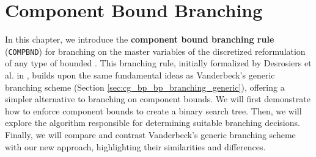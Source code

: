 \chapter{Component Bound Branching}\label{ch:cmpbnd}
In this chapter, we introduce the \textbf{component bound branching rule} (\texttt{COMPBND}) for branching on the master variables of the discretized reformulation of any type of bounded \IP{}. This branching rule, initially formalized by Desrosiers et al. in \cite{thebook}, builds upon the same fundamental ideas as Vanderbeck's generic branching scheme (Section \ref{sec:cg_bp_bp_branching_generic}), offering a simpler alternative to branching on component bounds. We will first demonstrate how to enforce component bounds to create a binary search tree. Then, we will explore the algorithm responsible for determining suitable branching decisions. Finally, we will compare and contrast Vanderbeck's generic branching scheme with our new approach, highlighting their similarities and differences.



